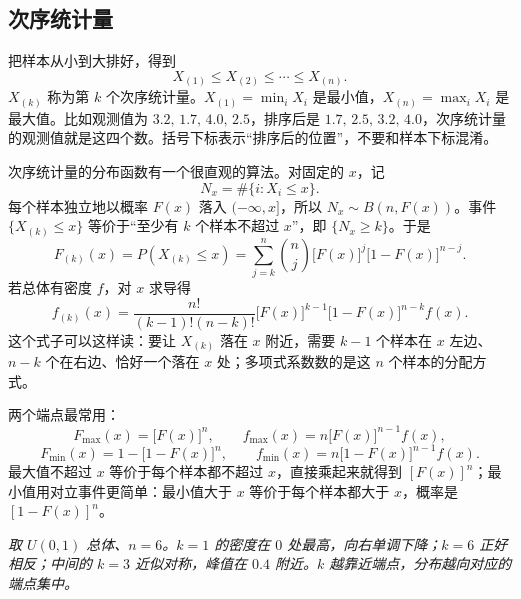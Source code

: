 \subsection{次序统计量}

把样本从小到大排好，得到
\[
    X_{(1)}\le X_{(2)}\le\cdots\le X_{(n)}.
\]
$X_{(k)}$ 称为第 $k$ 个次序统计量。$X_{(1)}=\min_i X_i$ 是最小值，$X_{(n)}=\max_i X_i$ 是最大值。比如观测值为 $3.2,\,1.7,\,4.0,\,2.5$，排序后是 $1.7,\,2.5,\,3.2,\,4.0$，次序统计量的观测值就是这四个数。括号下标表示“排序后的位置”，不要和样本下标混淆。

次序统计量的分布函数有一个很直观的算法。对固定的 $x$，记
\[
    N_x=\#\{i:X_i\le x\}.
\]
每个样本独立地以概率 $F(x)$ 落入 $(-\infty,x]$，所以 $N_x\sim B(n,F(x))$。事件 $\{X_{(k)}\le x\}$ 等价于“至少有 $k$ 个样本不超过 $x$”，即 $\{N_x\ge k\}$。于是
\[
    F_{(k)}(x)=P(X_{(k)}\le x)
    =\sum_{j=k}^{n}\binom{n}{j}\bigl[F(x)\bigr]^j
    \bigl[1-F(x)\bigr]^{n-j}.
\]
若总体有密度 $f$，对 $x$ 求导得
\[
    f_{(k)}(x)=\frac{n!}{(k-1)!(n-k)!}
    \bigl[F(x)\bigr]^{k-1}
    \bigl[1-F(x)\bigr]^{n-k}f(x).
\]
这个式子可以这样读：要让 $X_{(k)}$ 落在 $x$ 附近，需要 $k-1$ 个样本在 $x$ 左边、$n-k$ 个在右边、恰好一个落在 $x$ 处；多项式系数数的是这 $n$ 个样本的分配方式。

两个端点最常用：
\[
    F_{\max}(x)=\bigl[F(x)\bigr]^n,\qquad
    f_{\max}(x)=n\bigl[F(x)\bigr]^{n-1}f(x),
\]
\[
    F_{\min}(x)=1-\bigl[1-F(x)\bigr]^n,\qquad
    f_{\min}(x)=n\bigl[1-F(x)\bigr]^{n-1}f(x).
\]
最大值不超过 $x$ 等价于每个样本都不超过 $x$，直接乘起来就得到 $[F(x)]^n$；最小值用对立事件更简单：最小值大于 $x$ 等价于每个样本都大于 $x$，概率是 $[1-F(x)]^n$。

\begin{center}
\begin{minipage}{\linewidth}
\centering
{}
\par\vspace{2pt}
{\footnotesize\itshape 取 $U(0,1)$ 总体、$n=6$。$k=1$ 的密度在 $0$ 处最高，向右单调下降；$k=6$ 正好相反；中间的 $k=3$ 近似对称，峰值在 $0.4$ 附近。$k$ 越靠近端点，分布越向对应的端点集中。}
\end{minipage}
\end{center}

